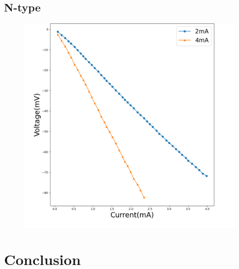\documentclass[aps,reprint,superscriptaddress,10pt]{revtex4-2}
\begin{document}
\subsection{N-type}

\begin{figure}[htbp]
  \centering
  \includegraphics[scale = 0.15]{Hall_n.png}
  \caption{}
  \label{fig:p}
\end{figure}


\section{Conclusion}
  
  



\nocite{*} 





\vfill
\end{document}
